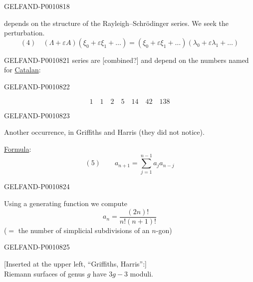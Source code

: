 \begin{GelfandAdjacentEvidence}{GELFAND-P001081}{8}


 depends on the structure of the Rayleigh–Schrödinger series. We seek the perturbation.
\begin{equation*}
(4)\quad
(\Lambda+\varepsilon A)(\xi_0+\varepsilon\xi_1+\ldots)
=(\xi_0+\varepsilon\xi_1+\ldots)(\lambda_0+\varepsilon\lambda_1+\ldots)
\end{equation*}
\end{GelfandAdjacentEvidence}



\begin{GelfandAdjacentEvidence}{GELFAND-P001082}{1}
series are [combined?] and depend on the numbers named for \uline{Catalan}:
\end{GelfandAdjacentEvidence}
\begin{GelfandAdjacentEvidence}{GELFAND-P001082}{2}

\[
1\quad 1\quad 2\quad 5\quad 14\quad 42\quad 138
\]
\end{GelfandAdjacentEvidence}
\begin{GelfandAdjacentEvidence}{GELFAND-P001082}{3}


Another occurrence, in Griffiths and Harris (they did not notice).

\uline{Formula}:
\[
(5)\qquad a_{n+1}=\sum_{j=1}^{n-1}a_j a_{n-j}
\]
\end{GelfandAdjacentEvidence}
\begin{GelfandAdjacentEvidence}{GELFAND-P001082}{4}


Using a generating function we compute
\[
a_n=\frac{(2n)!}{n!(n+1)!}
\]
($=$ the number of simplicial subdivisions of an $n$-gon)
\end{GelfandAdjacentEvidence}
\begin{GelfandAdjacentEvidence}{GELFAND-P001082}{5}


[Inserted at the upper left, “Griffiths, Harris”:]\\
Riemann surfaces of genus $g$ have $3g-3$ moduli.
\end{GelfandAdjacentEvidence}

